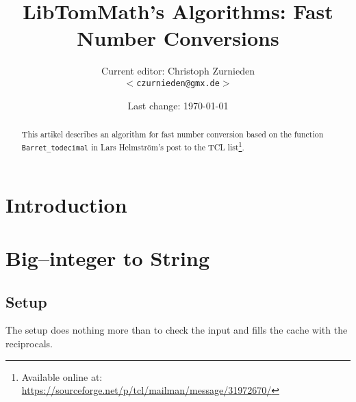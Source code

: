 \documentclass[a4paper,10pt]{article}
\theoremstyle{plain} %
\theoremstyle{definition}
\theoremstyle{remark}
\newcommand*{\smalltt}[1]{\small\texttt{#1}}
\begin{document}
\title{LibTomMath's Algorithms: Fast Number Conversions}
\author{Current editor: Christoph Zurnieden\\
        \small{\texttt{$<$czurnieden@gmx.de$>$}}}
\date{Last change: \today}
\maketitle

\renewcommand{\ttdefault}{pcr}



\begin{abstract}
This artikel describes an algorithm for fast number conversion based on the function \smalltt{Barret\_todecimal} in Lars Helmstr\"om's post to the TCL list\footnote{Available online at: \url{https://sourceforge.net/p/tcl/mailman/message/31972670/}}.
\end{abstract}

\section{Introduction}

\section{Big--integer to String}

\subsection{Setup}

The setup does nothing more than to check the input and fills the cache with the reciprocals.
\end{document}
